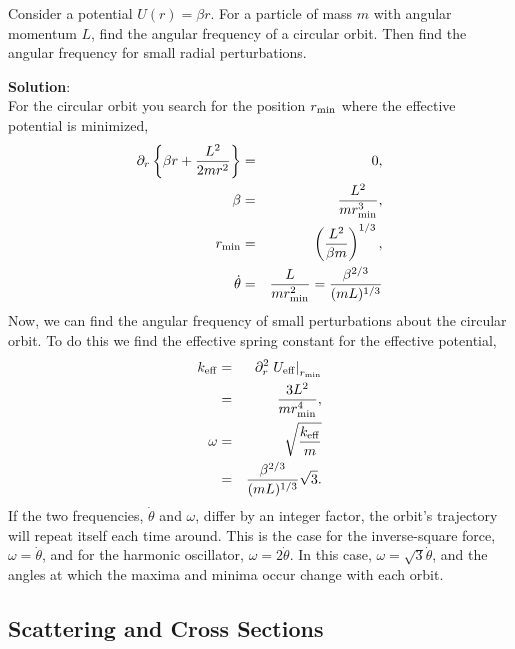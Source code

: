 \example
Consider a potential $U(r)=\beta r$. For a particle of mass $m$ with angular momentum $L$, find the angular frequency of a circular orbit. Then find the angular frequency for small radial perturbations.

{\bf Solution}:\\
For the circular orbit you search for the position $r_{\rm min}$ where the effective potential is minimized,
\begin{eqnarray*}
\partial_r\left\{\beta r+\frac{L^2}{2mr^2}\right\}&=&0,\\
\beta&=&\frac{L^2}{mr_{\rm min}^3},\\
r_{\rm min}&=&\left(\frac{L^2}{\beta m}\right)^{1/3},\\
\dot{\theta}&=&\frac{L}{mr_{\rm min}^2}=\frac{\beta^{2/3}}{(mL)^{1/3}}
\end{eqnarray*}
Now, we can find the angular frequency of small perturbations about the circular orbit. To do this we find the effective spring constant for the effective potential,
\begin{eqnarray*}
k_{\rm eff}&=&\partial_r^2 \left.U_{\rm eff}\right|_{r_{\rm min}}\\
&=&\frac{3L^2}{mr_{\rm min}^4},\\
\omega&=&\sqrt{\frac{k_{\rm eff}}{m}}\\
&=&\frac{\beta^{2/3}}{(mL)^{1/3}}\sqrt{3}.
\end{eqnarray*}
If the two frequencies, $\dot{\theta}$ and $\omega$, differ by an integer factor, the orbit's trajectory will repeat itself each time around. This is the case for the inverse-square force, $\omega=\dot{\theta}$, and for the harmonic oscillator, $\omega=2\dot{\theta}$. In this case, $\omega=\sqrt{3}\dot{\theta}$, and the angles at which the maxima and minima occur change with each orbit.
 
\exampleend

\subsection{Scattering and Cross Sections}

